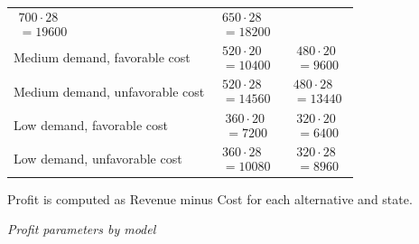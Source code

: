 \begin{ExamProblems}
\begin{center}
\begin{tabular}{l c c}
				$\begin{array}{l}
					700\cdot 28\\
					= 19600
				\end{array}$ &
				$\begin{array}{l}
					650\cdot 28\\
					= 18200
				\end{array}$ \\
				Medium demand, favorable cost &
				$\begin{array}{l}
					520\cdot 20\\
					= 10400
				\end{array}$ &
				$\begin{array}{l}
					480\cdot 20\\
					= 9600
				\end{array}$ \\
				Medium demand, unfavorable cost &
				$\begin{array}{l}
					520\cdot 28\\
					= 14560
				\end{array}$ &
				$\begin{array}{l}
					480\cdot 28\\
					= 13440
				\end{array}$ \\
				Low demand, favorable cost &
				$\begin{array}{l}
					360\cdot 20\\
					= 7200
				\end{array}$ &
				$\begin{array}{l}
					320\cdot 20\\
					= 6400
				\end{array}$ \\
				Low demand, unfavorable cost &
				$\begin{array}{l}
					360\cdot 28\\
					= 10080
				\end{array}$ &
				$\begin{array}{l}
					320\cdot 28\\
					= 8960
				\end{array}$ \\
				\bottomrule
		\end{tabular}
		\end{center}
		Profit is computed as Revenue minus Cost for each alternative and state.
		\begin{center}
		\textit{Profit parameters by model} \\

\end{center}
\end{ExamProblems}
